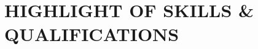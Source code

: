 \documentclass[11pt,a4paper,roman,colorlinks,linkcolor=blue,filecolor=magenta,urlcolor=cyan]{moderncv}        %
\begin{document}
\section{HIGHLIGHT OF SKILLS \& QUALIFICATIONS}
\begin{itemize} %

\end{itemize}
\end{document}
